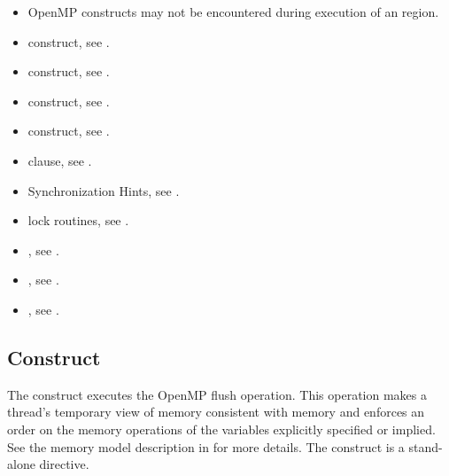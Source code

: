 \begin{itemize}
\item OpenMP constructs may not be encountered during execution of an
 region.
\end{itemize}


\crossreferences
\begin{itemize}
\item {} construct, see
.

\item {} construct, see
.

\item {} construct, see
.

\item {} construct, see
.

\item {} clause, see
.

\item Synchronization Hints, see
.

\item lock routines, see .

\item {}, see
.

\item {}, see
.

\item {}, see
.

\end{itemize}









\subsection{ Construct}
\label{subsec:flush Construct}
\summary
The  construct executes the OpenMP flush operation. This operation makes a
thread's temporary view of memory consistent with memory and enforces an order on
the memory operations of the variables explicitly specified or implied. See the memory
model description in  for more details. The  construct is a
stand-alone directive.

